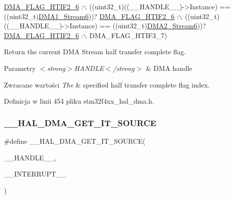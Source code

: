 \begin{DoxyCode}
      \hyperlink{group___d_m_a__flag__definitions_ga2ae0054d63c453a14b6d3822c503e7b4}{DMA\_FLAG\_HTIF2\_6} :\(\backslash\)
 ((uint32\_t)((\_\_HANDLE\_\_)->Instance) == ((uint32\_t)\hyperlink{group___peripheral__declaration_gac95127480470900755953f1cfe68567d}{DMA1\_Stream6}))? 
      \hyperlink{group___d_m_a__flag__definitions_ga2ae0054d63c453a14b6d3822c503e7b4}{DMA\_FLAG\_HTIF2\_6} :\(\backslash\)
 ((uint32\_t)((\_\_HANDLE\_\_)->Instance) == ((uint32\_t)\hyperlink{group___peripheral__declaration_ga11a00b283e0911cd427e277e5a314ccc}{DMA2\_Stream6}))? 
      \hyperlink{group___d_m_a__flag__definitions_ga2ae0054d63c453a14b6d3822c503e7b4}{DMA\_FLAG\_HTIF2\_6} :\(\backslash\)
   DMA\_FLAG\_HTIF3\_7)
\end{DoxyCode}


Return the current D\+MA Stream half transfer complete flag. 


\begin{DoxyParams}{Parametry}
{\em $<$strong$>$\+H\+A\+N\+D\+L\+E$<$/strong$>$} & D\+MA handle \\
\hline
\end{DoxyParams}

\begin{DoxyRetVals}{Zwracane wartości}
{\em The} & specified half transfer complete flag index. \\
\hline
\end{DoxyRetVals}


Definicja w linii 454 pliku stm32f4xx\+\_\+hal\+\_\+dma.\+h.

\mbox{\label{group___d_m_a_ga206f24e6bee4600515b9b6b1ec79365b}} 
\subsubsection{\texorpdfstring{\+\_\+\+\_\+\+H\+A\+L\+\_\+\+D\+M\+A\+\_\+\+G\+E\+T\+\_\+\+I\+T\+\_\+\+S\+O\+U\+R\+CE}{\_\_HAL\_DMA\_GET\_IT\_SOURCE}}
{\footnotesize\ttfamily \#define \+\_\+\+\_\+\+H\+A\+L\+\_\+\+D\+M\+A\+\_\+\+G\+E\+T\+\_\+\+I\+T\+\_\+\+S\+O\+U\+R\+CE(\begin{DoxyParamCaption}\item[{}]{\+\_\+\+\_\+\+H\+A\+N\+D\+L\+E\+\_\+\+\_\+,  }\item[{}]{\+\_\+\+\_\+\+I\+N\+T\+E\+R\+R\+U\+P\+T\+\_\+\+\_\+ }\end{DoxyParamCaption})}

